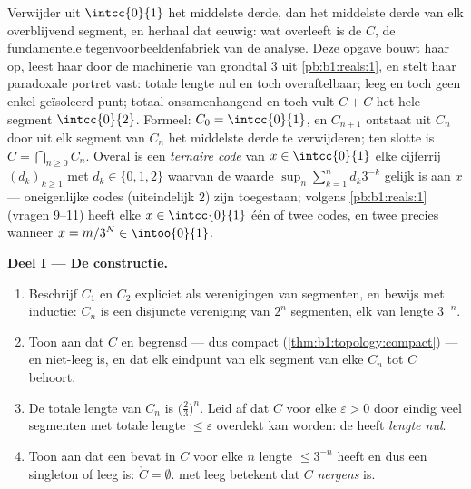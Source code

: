 \begin{problem}[{Weekendopgave --- de \omterm{pb:b1:topology:1}{Cantorverzameling} van de middelste
derden: lengte nul, overaftelbaar, perfect, en $C + C = \intcc{0}{2}$}]
\label{pb:b1:topology:1}
Verwijder uit $\intcc{0}{1}$ het  middelste derde, dan het middelste
derde van elk overblijvend segment, en herhaal dat eeuwig: wat overleeft
is de \emph{} $C$, de fundamentele
tegenvoorbeeldenfabriek van de analyse. Deze opgave bouwt haar op, leest
haar door de machinerie van grondtal $3$ uit \cref{pb:b1:reals:1}, en
stelt haar paradoxale portret vast: totale lengte nul en toch
overaftelbaar; leeg  en toch geen enkel geïsoleerd punt; totaal
onsamenhangend en toch vult $C + C$ het hele segment
$\intcc{0}{2}$. Formeel: $C_0 = \intcc{0}{1}$,
en $C_{n+1}$ ontstaat uit $C_n$ door uit elk segment van $C_n$ het 
middelste derde te verwijderen; ten slotte is $C = \bigcap_{n \geq 0}
C_n$. Overal is een \emph{ternaire code} van $x \in \intcc{0}{1}$ elke
cijferrij $(d_k)_{k\geq1}$ met $d_k \in \{0, 1, 2\}$ waarvan de waarde
$\sup_n \sum_{k=1}^n d_k 3^{-k}$ gelijk is aan $x$ --- oneigenlijke codes
(uiteindelijk $2$) zijn toegestaan; volgens \cref{pb:b1:reals:1} (vragen
9--11) heeft elke $x \in \intcc{0}{1}$ één of twee codes, en twee precies
wanneer $x = m/3^N \in \intoo{0}{1}$.

\medskip
\noindent\textbf{Deel I --- De constructie.}
\begin{enumerate}
  \item Beschrijf $C_1$ en $C_2$ expliciet als verenigingen van
        segmenten, en bewijs met inductie: $C_n$ is een disjuncte
        vereniging van $2^n$  segmenten, elk van lengte $3^{-n}$.
  \item Toon aan dat $C$  en begrensd --- dus compact
        (\cref{thm:b1:topology:compact}) --- en niet-leeg is, en dat elk
        eindpunt van elk segment van elke $C_n$ tot $C$ behoort.
  \item De totale lengte van $C_n$ is $\bigl(\frac23\bigr)^n$. Leid af
        dat $C$ voor elke $\varepsilon > 0$ door eindig veel segmenten
        met totale lengte $\leq \varepsilon$ overdekt kan worden: de
         heeft \emph{lengte nul}.
  \item Toon aan dat een  bevat in $C$ voor elke $n$ lengte
        $\leq 3^{-n}$ heeft en dus een singleton of leeg is: $\mathring
        C = \emptyset$.  met leeg  betekent dat $C$
        \emph{nergens } is.
\end{enumerate}


\end{problem}
